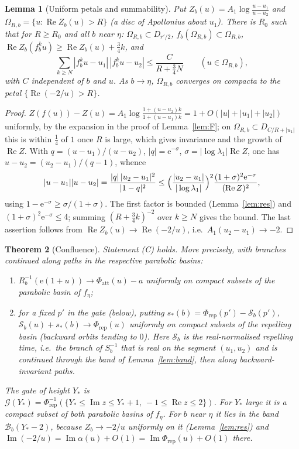 \documentclass[11pt]{amsart}
\newtheorem{theorem}{Theorem}[section]
\newtheorem{lemma}[theorem]{Lemma}
\theoremstyle{definition}
\newcommand{\Rr}{R}
\newcommand{\eee}{\mathrm{e}}
\begin{document}
\begin{lemma}[Uniform petals and summability]\label{lem:petal}
Put $Z_b(u)=A_1\log\frac{u-u_1}{u-u_2}$ and
$\Omega_{R,b}=\{u:\operatorname{Re}Z_b(u)>R\}$ (a disc of Apollonius about
$u_1$).  There is $R_0$ such that for $R\ge R_0$ and all $b$ near $\eta$:
$\Omega_{R,b}\subset D_{r'/2}$, $f_b(\Omega_{R,b})\subset\Omega_{R,b}$,
$\operatorname{Re}Z_b(f_b^ku)\ge\operatorname{Re}Z_b(u)+\tfrac34k$, and
\[
 \sum_{k\ge N}|f_b^ku-u_1|\,|f_b^ku-u_2|\le\frac{C}{R+\tfrac34N}
 \qquad(u\in\Omega_{R,b}),
\]
with $C$ independent of $b$ and $u$.  As $b\to\eta$, $\Omega_{R,b}$ converges on
compacta to the petal $\{\operatorname{Re}(-2/u)>R\}$.
\end{lemma}

\begin{proof}
$Z(f(u))-Z(u)=A_1\log\frac{1+(u-u_2)k}{1+(u-u_1)k}=1+O(|u|+|u_1|+|u_2|)$
uniformly, by the expansion in the proof of Lemma~\ref{lem:F}; on
$\Omega_{R,b}\subset D_{C/R+|u_1|}$ this is within $\tfrac14$ of $1$ once $R$ is large,
which gives invariance and the growth of $\operatorname{Re}Z$.  With
$q=(u-u_1)/(u-u_2)$, $|q|=\eee^{-\sigma}$, $\sigma=|\log\lambda_1|\operatorname{Re}Z$,
one has $u-u_2=(u_2-u_1)/(q-1)$, whence
\[
 |u-u_1||u-u_2|=\frac{|q|\,|u_2-u_1|^2}{|1-q|^2}
 \le\Bigl(\frac{|u_2-u_1|}{|\log\lambda_1|}\Bigr)^2
 \frac{(1+\sigma)^2\eee^{-\sigma}}{(\operatorname{Re}Z)^2},
\]
using $1-\eee^{-\sigma}\ge\sigma/(1+\sigma)$.  The first factor is bounded
(Lemma~\ref{lem:res}) and $(1+\sigma)^2\eee^{-\sigma}\le4$; summing
$(R+\tfrac34k)^{-2}$ over $k\ge N$ gives the bound.  The last assertion follows
from $\operatorname{Re}Z_b(u)\to\operatorname{Re}(-2/u)$, i.e.\
$A_1(u_2-u_1)\to-2$.
\end{proof}

\begin{theorem}[Confluence]\label{thm:C}
Statement \textup{(C)} holds.  More precisely, with branches continued along
paths in the respective parabolic basins:
\begin{enumerate}
\item $\Rr_b^{-1}(\eee(1+u))\to\Phi_{\mathrm{att}}(u)-a$ uniformly on compact
  subsets of the parabolic basin of $f_\eta$;
\item for a fixed $p'$ in the gate (below), putting
  $s_*(b)=\Phi_{\mathrm{rep}}(p')-\mathcal S_b(p')$,
  $\mathcal S_b(u)+s_*(b)\to\Phi_{\mathrm{rep}}(u)$ uniformly on compact
  subsets of the repelling basin (backward orbits tending to $0$).  Here
  $\mathcal S_b$ is the real-normalised repelling time, i.e.\ the branch of
  $S_b^{-1}$ that is real on the segment $(u_1,u_2)$ and is continued through
  the band of Lemma~\ref{lem:band}, then along backward-invariant paths.
\end{enumerate}
The \emph{gate} of height $Y_*$ is $\mathcal G(Y_*)=\Phi_{\mathrm{rep}}^{-1}
(\{Y_*\le\operatorname{Im}z\le Y_*+1,\ -1\le\operatorname{Re}z\le2\})$.  For $Y_*$ large it is a compact
subset of both parabolic basins of $f_\eta$.  For $b$ near $\eta$ it lies in
the band $\mathcal B_b(Y_*-2)$, because $Z_b\to-2/u$ uniformly on it
(Lemma~\ref{lem:res}) and $\operatorname{Im}(-2/u)=\operatorname{Im}\alpha(u)+O(1)
=\operatorname{Im}\Phi_{\mathrm{rep}}(u)+O(1)$ there.
\end{theorem}
\end{document}
